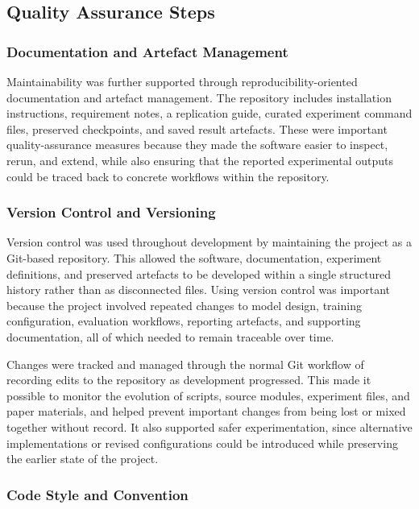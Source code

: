 ﻿\documentclass[11pt,a4paper]{article}
\begin{document}
\subsection{Quality Assurance Steps}

\subsubsection*{Documentation and Artefact Management}

Maintainability was further supported through reproducibility-oriented
documentation and artefact management. The repository includes installation
instructions, requirement notes, a replication guide, curated experiment
command files, preserved checkpoints, and saved result artefacts.
These were important quality-assurance measures because they made the software
easier to inspect, rerun, and extend, while also ensuring that the reported
experimental outputs could be traced back to concrete workflows within the
repository.

\subsubsection{Version Control and Versioning}

Version control was used throughout development by maintaining the project as a
Git-based repository. This allowed the software, documentation, experiment
definitions, and preserved artefacts to be developed within a single
structured history rather than as disconnected files.
Using version control was important because the project involved repeated
changes to model design, training configuration, evaluation workflows,
reporting artefacts, and supporting documentation, all of which needed to
remain traceable over time.

\medskip

Changes were tracked and managed through the normal Git workflow of recording
edits to the repository as development progressed. This made it possible to
monitor the evolution of scripts, source modules, experiment files, and paper
materials, and helped prevent important changes from being lost or mixed
together without record.
It also supported safer experimentation, since alternative implementations or
revised configurations could be introduced while preserving the earlier state
of the project.

\subsubsection{Code Style and Convention}
\end{document}

